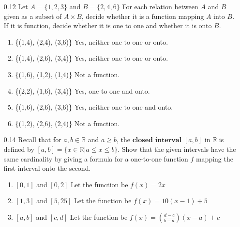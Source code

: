 \documentclass[12pt]{article}
\newcommand{\R}{\mathbb{R}}
\begin{document}
\begin{enumerate}
	\item[0.12] Let $A = \{1,2,3\}$ and $B = \{2,4,6\}$ For each relation between $A$ and $B$ given as a subset of $ A \times B$, decide whether it is a function mapping $A$ into $B$. If it is function, decide whether it is one to one and whether it is onto $B$.
	\begin{enumerate}
		\item \{(1,4), (2,4), (3,6)\} \quad Yes, neither one to one or onto.
		\item \{(1,4), (2,6), (3,4)\} \quad Yes, neither one to one or onto.
		\item \{(1,6), (1,2), (1,4)\} \quad Not a function.
		\item \{(2,2), (1,6), (3,4)\} \quad Yes, one to one and onto.
		\item \{(1,6), (2,6), (3,6)\} \quad Yes, neither one to one and onto.
		\item \{(1,2), (2,6), (2,4)\} \quad Not a function.
	\end{enumerate}

		\item[0.14] Recall that for $a,b \in \R$ and $a \geq b$, the $\textbf{closed interval } [a,b]$ in $\R$ is defined by $[a,b] = \{x\in \R|a\leq x \leq b \}$. Show that the given intervals have the same cardinality by giving a formula for a one-to-one function $f$ mapping the first interval onto the second.
	\begin{enumerate}
		\item $[0,1]$ and $[0,2]$ \quad	Let the function be $f(x)=2x$
		\item $[1,3]$ and $[5,25]$ \quad Let the function be $f(x)=10(x-1)+5$
		\item $[a,b]$ and $[c,d]$ \quad	Let the function be $f(x)=(\frac{d-c}{b-a})(x-a)+c$
	\end{enumerate}
	

\end{enumerate}
\end{document}
